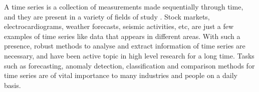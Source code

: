 \documentclass[../main.tex]{subfiles}
\begin{document}
    A time series is a collection of measurements made sequentially through time, and they are present in a variety of fields of study \cite[Chapter~5]{chatfield2019analysis}. Stock markets, electrocardiograms, weather forecasts, seismic activities, etc, are just a few examples of time series like data that appears in different areas. With such a presence, robust methods to analyse and extract information of time series are necessary, and have been active topic in high level research for a long time. Tasks such as forecasting, anomaly detection, classification and comparison methods for time series are of vital importance to many industries and people on a daily basis.
\end{document}
